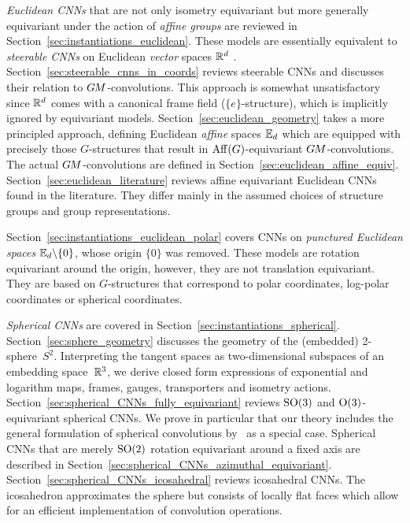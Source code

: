 \emph{Euclidean CNNs} that are not only isometry equivariant but more generally equivariant under the action of \emph{affine groups} are reviewed in Section~\ref{sec:instantiations_euclidean}.
These models are essentially equivalent to \emph{steerable CNNs} on Euclidean \emph{vector} spaces $\mathbb{R}^d$ \cite{Cohen2017-STEER,3d_steerableCNNs,Weiler2019_E2CNN}.
Section~\ref{sec:steerable_cnns_in_coords} reviews steerable CNNs and discusses their relation to $G\mkern-1.4muM$-convolutions.
This approach is somewhat unsatisfactory since $\mathbb{R}^d$ comes with a canonical frame field ($\{e\}$-structure), which is implicitly ignored by equivariant models.
Section~\ref{sec:euclidean_geometry} takes a more principled approach, defining Euclidean \emph{affine} spaces $\mathbb{E}_d$ which are equipped with precisely those $G$-structures that result in $\operatorname{Aff}(G)$-equivariant $G\mkern-1.4muM$-convolutions.
The actual $G\mkern-1.4muM$-convolutions are defined in Section~\ref{sec:euclidean_affine_equiv}.
Section~\ref{sec:euclidean_literature} reviews affine equivariant Euclidean CNNs found in the literature.
They differ mainly in the assumed choices of structure groups and group representations.

Section~\ref{sec:instantiations_euclidean_polar} covers CNNs on \emph{punctured Euclidean spaces} $\mathbb{E}_d\backslash\{0\}$, whose origin $\{0\}$ was removed.
These models are rotation equivariant around the origin, however, they are not translation equivariant.
They are based on $G$-structures that correspond to polar coordinates, log-polar coordinates or spherical coordinates.

\emph{Spherical CNNs} are covered in Section~\ref{sec:instantiations_spherical}.
Section~\ref{sec:sphere_geometry} discusses the geometry of the (embedded) 2-sphere~$S^2$.
Interpreting the tangent spaces as two-dimensional subspaces of an embedding space~$\mathbb{R}^3$, we derive closed form expressions of exponential and logarithm maps, frames, gauges, transporters and isometry actions.
Section~\ref{sec:spherical_CNNs_fully_equivariant} reviews $\operatorname{SO}(3)$ and $\operatorname{O}(3)$-equivariant spherical CNNs.
We prove in particular that our theory includes the general formulation of spherical convolutions by~\citet{Cohen2019-generaltheory} as a special case.
Spherical CNNs that are merely $\operatorname{SO}(2)$ rotation equivariant around a fixed axis are described in Section~\ref{sec:spherical_CNNs_azimuthal_equivariant}.
Section~\ref{sec:spherical_CNNs_icosahedral} reviews icosahedral CNNs.
The icosahedron approximates the sphere but consists of locally flat faces which allow for an efficient implementation of convolution operations.

